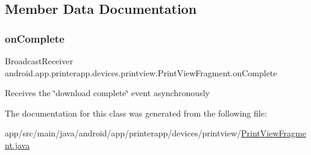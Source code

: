 \subsection{Member Data Documentation}
\mbox{\label{classandroid_1_1app_1_1printerapp_1_1devices_1_1printview_1_1_print_view_fragment_a4b21940cd18f50e1d1e186e8214f3bac}} 
\subsubsection{\texorpdfstring{on\+Complete}{onComplete}}
{\footnotesize\ttfamily Broadcast\+Receiver android.\+app.\+printerapp.\+devices.\+printview.\+Print\+View\+Fragment.\+on\+Complete}

Receives the \char`\"{}download complete\char`\"{} event asynchronously 

The documentation for this class was generated from the following file\+:\begin{DoxyCompactItemize}
\item 
app/src/main/java/android/app/printerapp/devices/printview/\hyperlink{_print_view_fragment_8java}{Print\+View\+Fragment.\+java}\end{DoxyCompactItemize}
